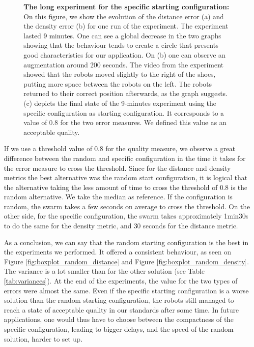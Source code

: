 \documentclass[oneside, a4paper, 12pt]{memoir}
\let\oldCaption\caption
\renewcommand{\caption}[2]{
\oldCaption[#1]{{\small\sffamily\bfseries #1:} #2}
}
\begin{document}
\begin{figure}[!htp]
					\caption{The long experiment for the specific starting configuration}{On this figure, we show the evolution of the distance error (a) and the density error (b) for one run of the experiment. The experiment lasted 9 minutes. One can see a global decrease in the two graphs showing that the behaviour tends to create a circle that presents good characteristics for our application. On (b) one can observe an augmentation around 200 seconds. The video from the experiment showed that the robots moved slightly to the right of the shoes, putting more space between the robots on the left. The robots returned to their correct position afterwards, as the graph suggests. (c) depicts the final state of the 9-minutes experiment using the specific configuration as starting configuration. It corresponds to a value of 0.8 for the two error measures. We defined this value as an acceptable quality.}
					\label{fig:geolong}
				\end{figure}
				
				If we use a threshold value of 0.8 for the quality measure, we observe a great difference between the random and specific configuration in the time it takes for the error measure to cross the threshold. Since for the distance and density metrics the best alternative was the random start configuration, it is logical that the alternative taking the less amount of time to cross the threshold of 0.8 is the random alternative. We take the median as reference. If the configuration is random, the swarm takes a few seconds on average to cross the threshold. On the other side, for the specific configuration, the swarm takes approximately 1min30s to do the same for the density metric, and 30 seconds for the distance metric.
				
				As a conclusion, we can say that the random starting configuration is the best in the experiments we performed. It offered a consistent behaviour, as seen on Figure \ref{fig:boxplot_random_distance} and Figure \ref{fig:boxplot_random_density}. The variance is a lot smaller than for the other solution (see Table \ref{tab:variances}). At the end of the experiments, the value for the two types of errors were almost the same. Even if the specific starting configuration is a worse solution than the random starting configuration, the robots still managed to reach a state of acceptable quality in our standards after some time. In future applications, one would thus have to choose between the compactness of the specific configuration, leading to bigger delays, and the speed of the random solution, harder to set up.
				
\end{document}
